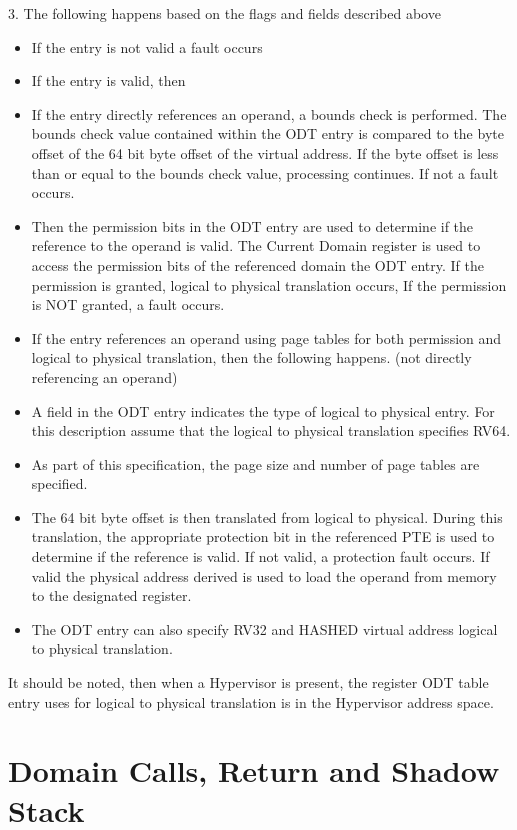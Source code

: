 \documentclass{article}
\begin{document}
\begin{appendices}
3.	The following happens based on the flags and fields described above
\begin{itemize}

\item If the entry is not valid a fault occurs
\item If the entry is  valid, then
\item If the entry directly references an operand, a  bounds check is performed.  The bounds check value contained within the ODT entry is compared to the byte offset of the 64 bit byte offset of the virtual address.  If the byte offset is less than or equal to the bounds check value, processing continues.  If not a fault occurs.
\item Then the permission  bits in the ODT entry are used to determine if the reference to the operand is valid.  The Current Domain register is used to access the permission bits of the referenced domain the ODT entry.  If the permission is granted,   logical to physical translation occurs,  If the permission is NOT granted,  a fault occurs.
\item If the entry references an operand using  page tables for both permission and logical to  physical translation,  then the following  happens. (not directly referencing an operand)
\item A field in the ODT entry indicates the type of logical to physical entry.  For this description assume that the logical to physical translation specifies RV64. 
\item As part of this specification,  the page size and number of page tables are specified.
\item The 64 bit byte offset is then translated from logical to physical.  During this translation,  the appropriate protection bit in the referenced PTE  is used to determine if the reference is valid.  If not valid,  a protection fault occurs. If valid the physical address derived is used to load the operand from memory to the designated register.
\item The ODT entry can also specify  RV32 and HASHED virtual address logical to physical  translation.

\end{itemize}




It should be noted,  then when a Hypervisor is present,  the register ODT table entry uses for logical to physical   translation is in the Hypervisor address space.  


\section{Domain Calls, Return and Shadow Stack}
\label{sec:AppendixB}


\end{appendices}
\end{document}
